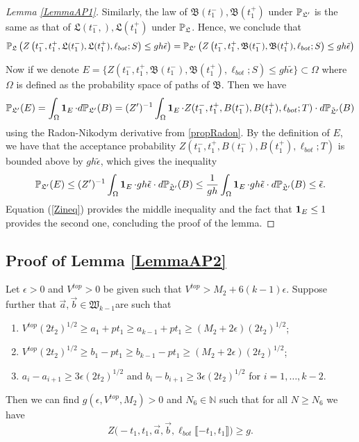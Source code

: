 \begin{proof}[Lemma \ref{LemmaAP1}]
	Similarly,  the law of $\mathfrak B(t_1^-), \mathfrak{B}(t_1^+)$ under $\mathbb{P}_{\mathfrak L'}$ is the same as that of $\mathfrak L(t_1^-,), \mathfrak L(t_1^+)$ under $\mathbb{P}_{\mathfrak L}$. Hence, we conclude that 
	\begin{equation}
	\mathbb{P}_{\mathfrak L}\left(Z\left(t_1^-,t_1^+,\mathfrak L(t_1^-),\mathfrak L(t_1^+),\ell_{bot};S\right)\leq gh\tilde \epsilon\right)=\mathbb{P}_{\mathfrak L'}\left(Z\left(t_1^-,t_1^+,\mathfrak B(t_1^-),\mathfrak B(t_1^+),\ell_{bot};S\right)\leq gh\tilde \epsilon\right)
	\end{equation}
	
	Now if we denote $E=\{Z(t_1^-,t_1^+,\mathfrak{B}(t_1^-),\mathfrak{B}(t_1^+),\ell_{bot};S)\leq gh\tilde\epsilon\}\subset \Omega$ where $\Omega$ is defined as the probability space of paths of $\mathfrak B$. Then we have 
	\[
	\mathbb{P}_{\mathfrak L'}(E)=\int_\Omega \operatorname{\mathbf{1}}_E\cdot d\mathbb{P}_{\mathfrak L'}(B)=(Z')^{-1}\int_\Omega\operatorname{\mathbf{1}}_E\cdot Z(t_1^-,t_1^+,B(t_1^-),B(t_1^+),\ell_{bot};T)\cdot d\mathbb{P}_{\tilde{\mathfrak{L}}'}(B)
	\]
	using the Radon-Nikodym derivative from \ref{propRadon}. By the definition of $E$, we have that the acceptance probability $Z(t_1^-,t_1^+,B(t_1^-),B(t_1^+),\ell_{bot};T)$ is bounded above by $gh\tilde{\epsilon}$, which gives the inequality \[\mathbb{P}_{\mathfrak L'}(E)\leq (Z')^{-1}\int_\Omega \operatorname{\mathbf{1}}_E\cdot gh\tilde{\epsilon}\cdot d\mathbb{P}_{\tilde{\mathfrak{L}}'}(B)\leq \frac{1}{gh}\int_\Omega\operatorname{\mathbf{1}}_E\cdot gh\tilde\epsilon\cdot d\mathbb{P}_{\tilde{\mathfrak{L}}'}(B)\leq \tilde{\epsilon}.\] Equation (\ref{Zineq})  provides the middle inequality and the fact that $\operatorname{\mathbf{1}}_E\leq 1$ provides the second one, concluding the proof of the lemma.
	
\end{proof}

\subsection{Proof of Lemma \ref{LemmaAP2}} \label{sect62}


\begin{lemma}\label{LemmaBP1} Let $\epsilon > 0$ and $V^{top} > 0$ be given such that $V^{top} > M_2 + 6 (k-1) \epsilon$. Suppose further that $\vec{a}, \vec{b} \in \mathfrak{W}_{k-1}$are such that 
	\begin{enumerate}
		\item $V^{top} (2t_2)^{1/2} \geq a_1 + p t_1 \geq a_{k-1} + pt_1 \geq (M_2 + 2 \epsilon) (2t_2)^{1/2}$;
		\item $V^{top} (2t_2)^{1/2} \geq b_1 - p t_1 \geq b_{k-1} - pt_1 \geq (M_2 + 2 \epsilon) (2t_2)^{1/2}$; 
		\item $a_i -a_{i+1} \geq 3\epsilon (2t_2)^{1/2}$ and $b_{i} - b_{i+1} \geq 3 \epsilon (2t_2)^{1/2}$ for $i = 1, \dots, k-2$.
	\end{enumerate}
	Then we can find $g(\epsilon, V^{top}, M_2) > 0$ and $N_6 \in \mathbb{N}$ such that for all $N \geq N_6$ we have 
	\begin{equation}\label{eqnRT}
	Z\big(  -t_1, t_1, \vec{a} ,\vec{b}, \ell_{bot}\llbracket -t_1, t_1\rrbracket\big) \geq g.
	\end{equation}
\end{lemma}

